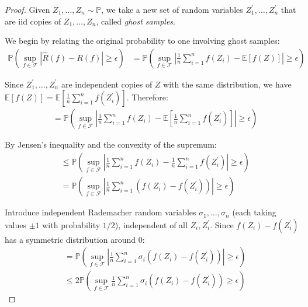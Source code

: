   \begin{proof}
    Given $Z_1, \ldots, Z_n \sim \mathbb{P}$, we take a new set of random variables $Z_1^{\prime}, \ldots, Z_n^{\prime}$ that are iid copies of $Z_1, \ldots, Z_n$, called \textit{ghost samples}.
   
    We begin by relating the original probability to one involving ghost samples:
    \begin{align}
      \mathbb{P} \left( \sup_{f \in \mathcal{F}} | \hat{R}(f) - R(f) | \geq \epsilon \right) &= \mathbb{P} \left( \sup_{f \in \mathcal{F}} \left| \frac{1}{n} \sum_{i=1}^n f(Z_i) - \mathbb{E}[f(Z)] \right| \geq \epsilon \right)
    \end{align}
   
    Since $Z_1^{\prime}, \ldots, Z_n^{\prime}$ are independent copies of $Z$ with the same distribution, we have $\mathbb{E}[f(Z)] = \mathbb{E}\left[\frac{1}{n} \sum_{i=1}^n f(Z_i^{\prime})\right]$. Therefore:
    \begin{align}
      &= \mathbb{P} \left( \sup_{f \in \mathcal{F}} \left| \frac{1}{n} \sum_{i=1}^n f(Z_i) - \mathbb{E}\left[\frac{1}{n} \sum_{i=1}^n f(Z_i^{\prime})\right] \right| \geq \epsilon \right)
    \end{align}
   
    By Jensen's inequality and the convexity of the supremum:
    \begin{align}
      &\leq \mathbb{P} \left( \sup_{f \in \mathcal{F}} \left| \frac{1}{n} \sum_{i=1}^n f(Z_i) - \frac{1}{n} \sum_{i=1}^n f(Z_i^{\prime}) \right| \geq \epsilon \right)\\
      &= \mathbb{P} \left( \sup_{f \in \mathcal{F}} \left| \frac{1}{n} \sum_{i=1}^n (f(Z_i) - f(Z_i^{\prime})) \right| \geq \epsilon \right)
    \end{align}
   
    Introduce independent Rademacher random variables $\sigma_1, \ldots, \sigma_n$ (each taking values $\pm 1$ with probability $1/2$), independent of all $Z_i, Z_i^{\prime}$. Since $f(Z_i) - f(Z_i^{\prime})$ has a symmetric distribution around 0:
    \begin{align}
      &= \mathbb{P} \left( \sup_{f \in \mathcal{F}} \left| \frac{1}{n} \sum_{i=1}^n \sigma_i (f(Z_i) - f(Z_i^{\prime})) \right| \geq \epsilon \right)\\
      &\leq 2\mathbb{P} \left( \sup_{f \in \mathcal{F}} \frac{1}{n} \sum_{i=1}^n \sigma_i (f(Z_i) - f(Z_i^{\prime})) \geq \epsilon \right)
    \end{align}
   

\end{proof}
